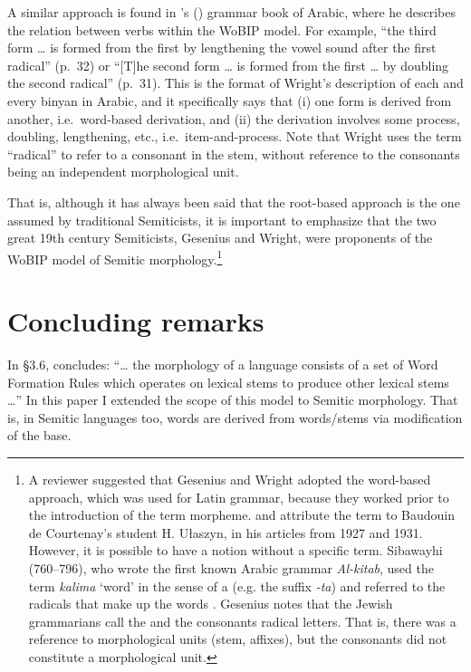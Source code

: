 \documentclass[output=paper,
modfonts
]{LSP/langsci}
\begin{document}
A similar approach is found in \citeauthor{wright1859a}'s (\citeyear{wright1859a}) grammar book of
Arabic, where he describes the relation between verbs within the WoBIP
model. For example, ``the third form \ldots{} is formed from the first
by lengthening the vowel sound after the first radical'' (p.\ 32) or
``{[}T{]}he second form \ldots{} is formed from the first \ldots{} by
doubling the second radical'' (p.\ 31). This is the format of Wright's
description of each and every binyan in Arabic, and it specifically says
that (i) one form is derived from another, i.e.\ word-based derivation,
and (ii) the derivation involves some process, doubling, lengthening,
etc., i.e.\ item-and-process. Note that Wright uses the term ``radical'' to
refer to a consonant in the stem, without reference to the 
consonants being an independent morphological unit.

\largerpage[-1]
That is, although it has always been said that the root-based approach
is the one assumed by traditional Semiticists, it is important to
emphasize that the two great 19th century Semiticists,
Gesenius and Wright, were proponents of the WoBIP model of Semitic
morphology.\footnote{A reviewer suggested that Gesenius and Wright
  adopted the word-based approach, which was used for Latin grammar,
  because they worked prior to the introduction of the term morpheme.
  \citet{kilbury1976a} and \citet{anderson1985a} attribute the term  to
  Baudouin de Courtenay's student H. Ułaszyn, in his articles from 1927
  and 1931. However, it is possible to have a notion without a specific
  term. Sibawayhi (760--796), who wrote the first known Arabic grammar
  \emph{Al-kitab}, used the term \emph{kalima} `word' in the sense of a
   (e.g. the suffix \emph{-ta}) and referred to the radicals
  that make up the words \citep{levin1986}. Gesenius notes that the Jewish
  grammarians call the   and the  consonants radical
  letters. That is, there was a reference to morphological units (stem,
  affixes), but the  consonants did not constitute a morphological
  unit.}

\section{Concluding remarks}\label{concluding-remarksB}\label{sec:batel:7}

In \S3.6, \citet[71]{anderson1992} concludes: ``\ldots{} the morphology of
a language consists of a set of Word Formation Rules which operates on
lexical stems to produce other lexical stems \ldots{}'' In this
paper I extended the scope of this model to Semitic morphology. That is,
in Semitic languages too, words are derived from words/stems via
modification of the base.
\end{document}

